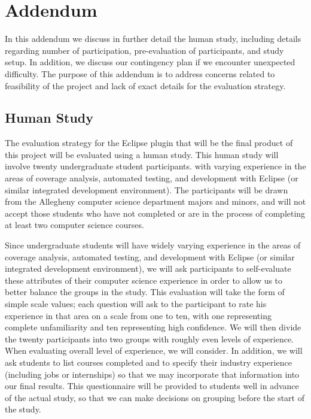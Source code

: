 %
%

\chapter{Addendum}\label{appa:add}


In this addendum we discuss in further detail the human study, including
details regarding number of participation, pre-evaluation of participants,
and study setup.  In addition, we discuss our contingency plan if we
encounter unexpected difficulty.  The purpose of this addendum is to address
concerns related to feasibility of the project and lack of exact details for
the evaluation strategy.

\section{Human Study}\label{sec:addhs}

The evaluation strategy for the Eclipse plugin that will be the final product
of this project will be evaluated using a human study.  This human study will
involve twenty undergraduate student participants. with varying experience in
the areas of coverage analysis, automated testing, and development with Eclipse
(or similar integrated development environment).  The participants will be drawn 
from the Allegheny computer science department majors and minors, and will not
accept those students who have not completed or are in the process of completing
at least two computer science courses.

Since undergraduate students will have widely varying experience in
the areas of coverage analysis, automated testing, and development with Eclipse
(or similar integrated development environment), we will ask participants
to self-evaluate these attributes of their computer science experience in order
to allow us to better balance the groups in the study.  This evaluation will
take the form of simple scale values; each question will ask to the participant
to rate his experience in that area on a scale from one to ten, with one representing
complete unfamiliarity and ten representing high confidence.  We will then divide
the twenty participants into two groups with roughly even levels of experience.  
When evaluating overall level of experience, we will consider.  In addition,
we will ask students to list courses completed and to specify their industry
experience (including jobs or internships) so that we may incorporate that information
into our final results.  This questionnaire will be provided to students well in advance
of the actual study, so that we can make decisions on grouping before the start of
the study.

